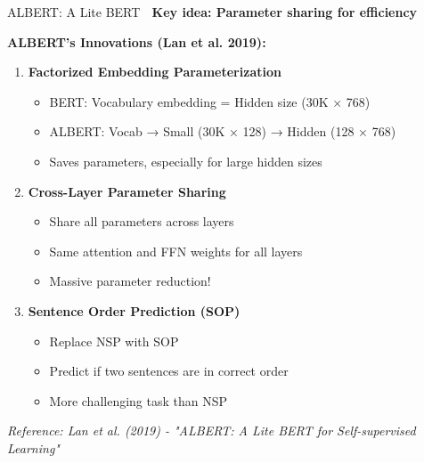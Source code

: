 \documentclass[aspectratio=169]{beamer}
\begin{document}
\begin{frame}[shrink=10]{ALBERT: A Lite BERT 🔬}
\textbf{Key idea: Parameter sharing for efficiency}

\vspace{1em}

\textbf{ALBERT's Innovations (Lan et al. 2019):}

\begin{enumerate}\setlength{\itemsep}{0pt}
    \item \textbf{Factorized Embedding Parameterization}
    \begin{itemize}\setlength{\itemsep}{0pt}
        \item BERT: Vocabulary embedding = Hidden size (30K × 768)
        \item ALBERT: Vocab → Small (30K × 128) → Hidden (128 × 768)
        \item Saves parameters, especially for large hidden sizes
    \end{itemize}

    \vspace{0.5em}

    \item \textbf{Cross-Layer Parameter Sharing}
    \begin{itemize}\setlength{\itemsep}{0pt}
        \item Share all parameters across layers
        \item Same attention and FFN weights for all layers
        \item \alert{Massive parameter reduction!}
    \end{itemize}

    \vspace{0.5em}

    \item \textbf{Sentence Order Prediction (SOP)}
    \begin{itemize}\setlength{\itemsep}{0pt}
        \item Replace NSP with SOP
        \item Predict if two sentences are in correct order
        \item More challenging task than NSP
    \end{itemize}
\end{enumerate}

\small
\textit{Reference: Lan et al. (2019) - "ALBERT: A Lite BERT for Self-supervised Learning"}
\end{frame}
\end{document}
